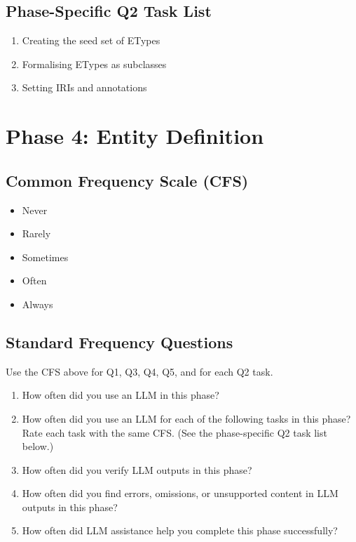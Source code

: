 \subsection*{Phase-Specific Q2 Task List}
\begin{enumerate}
  \item[a.] Creating the seed set of ETypes
  \item[b.] Formalising ETypes as subclasses
  \item[c.] Setting IRIs and annotations
\end{enumerate}

\section*{Phase 4: Entity Definition}

\subsection*{Common Frequency Scale (CFS)}
\begin{itemize}
  \item[A.] Never
  \item[B.] Rarely
  \item[C.] Sometimes
  \item[D.] Often
  \item[E.] Always
\end{itemize}

\subsection*{Standard Frequency Questions}
Use the CFS above for Q1, Q3, Q4, Q5, and for each Q2 task.
\begin{enumerate}
  \item[Q1.] How often did you use an LLM in this phase?
  \item[Q2.] How often did you use an LLM for each of the following tasks in this phase? Rate each task with the same CFS. (See the phase-specific Q2 task list below.)
  \item[Q3.] How often did you verify LLM outputs in this phase?
  \item[Q4.] How often did you find errors, omissions, or unsupported content in LLM outputs in this phase?
  \item[Q5.] How often did LLM assistance help you complete this phase successfully?
\end{enumerate}

